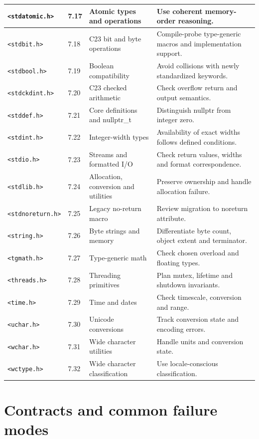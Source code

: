 \documentclass[10pt,letterpaper,oneside]{report}
\begin{document}
\begin{longtable}{p{.18\linewidth}p{.075\linewidth}p{.26\linewidth}p{.375\linewidth}}
\texttt{<stdatomic.h>} & 7.17 & Atomic types and operations & Use coherent memory-order reasoning.\\\hline
\texttt{<stdbit.h>} & 7.18 & C23 bit and byte operations & Compile-probe type-generic macros and implementation support.\\\hline
\texttt{<stdbool.h>} & 7.19 & Boolean compatibility & Avoid collisions with newly standardized keywords.\\\hline
\texttt{<stdckdint.h>} & 7.20 & C23 checked arithmetic & Check overflow return and output semantics.\\\hline
\texttt{<stddef.h>} & 7.21 & Core definitions and nullptr\_t & Distinguish nullptr from integer zero.\\\hline
\texttt{<stdint.h>} & 7.22 & Integer-width types & Availability of exact widths follows defined conditions.\\\hline
\texttt{<stdio.h>} & 7.23 & Streams and formatted I/O & Check return values, widths and format correspondence.\\\hline
\texttt{<stdlib.h>} & 7.24 & Allocation, conversion and utilities & Preserve ownership and handle allocation failure.\\\hline
\texttt{<stdnoreturn.h>} & 7.25 & Legacy no-return macro & Review migration to noreturn attribute.\\\hline
\texttt{<string.h>} & 7.26 & Byte strings and memory & Differentiate byte count, object extent and terminator.\\\hline
\texttt{<tgmath.h>} & 7.27 & Type-generic math & Check chosen overload and floating types.\\\hline
\texttt{<threads.h>} & 7.28 & Threading primitives & Plan mutex, lifetime and shutdown invariants.\\\hline
\texttt{<time.h>} & 7.29 & Time and dates & Check timescale, conversion and range.\\\hline
\texttt{<uchar.h>} & 7.30 & Unicode conversions & Track conversion state and encoding errors.\\\hline
\texttt{<wchar.h>} & 7.31 & Wide character utilities & Handle units and conversion state.\\\hline
\texttt{<wctype.h>} & 7.32 & Wide character classification & Use locale-conscious classification.\\\hline
\bottomrule\end{longtable}\normalsize
\chapter{Contracts and common failure modes}
\end{document}
